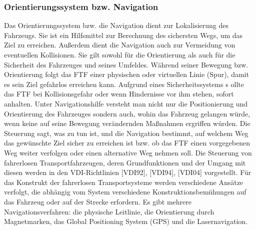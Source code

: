 \subsubsection{Orientierungssystem bzw. Navigation}
Das Orientierungssystem bzw. die Navigation dient zur Lokalisierung des Fahrzeugs. Sie ist ein Hilfsmittel 
zur Berechnung des sichersten Wegs, um das Ziel zu erreichen. Au\ss erdem dient die Navigation auch zur 
Vermeidung von eventuellen Kollisionen. Sie gilt sowohl f\"ur die Orientierung als auch f\"ur die Sicherheit 
des Fahrzeuges und seines Umfeldes. W\"ahrend seiner Bewegung bzw. Orientierung folgt das FTF einer physischen 
oder virtuellen Linie (Spur), damit es sein Ziel gefahrlos erreichen kann. Aufgrund eines Sicherheitssystems s
ollte das FTF bei Kollisionsgefahr oder wenn Hindernisse vor ihm stehen, sofort anhalten. 
Unter Navigationshilfe versteht man nicht nur die Positionierung und Orientierung des Fahrzeuges sondern auch, 
wohin das Fahrzeug gelangen w\"urde, wenn keine auf seine Bewegung ver\"andernden Ma\ss nahmen ergriffen würden.
Die Steuerung sagt, was zu tun ist, und die Navigation bestimmt, auf welchem Weg das gew\"unschte Ziel sicher zu 
erreichen ist bzw. ob das FTF einen vorgegebenen Weg weiter verfolgen oder einen alternative Weg nehmen soll.
Die Steuerung von fahrerlosen Transportfahrzeugen, deren Grundfunktionen und der Umgang mit diesen werden in den 
VDI-Richtlinien [VDI92], [VDI94], [VDI04] vorgestellt. F\"ur das Konstrukt der fahrerlosen Transportsysteme 
werden verschiedene Ans\"atze verfolgt, die abh\"angig vom System verschiedene Konstruktionsbem\"uhungen auf 
das Fahrzeug oder auf der Strecke erfordern. Es gibt mehrere Navigationsverfahren: die physische Leitlinie, 
die Orientierung durch Magnetmarken, das Global Positioning System (GPS) und die Lasernavigation\cite[vgl.][S. 112]{Guenther:2011}.
